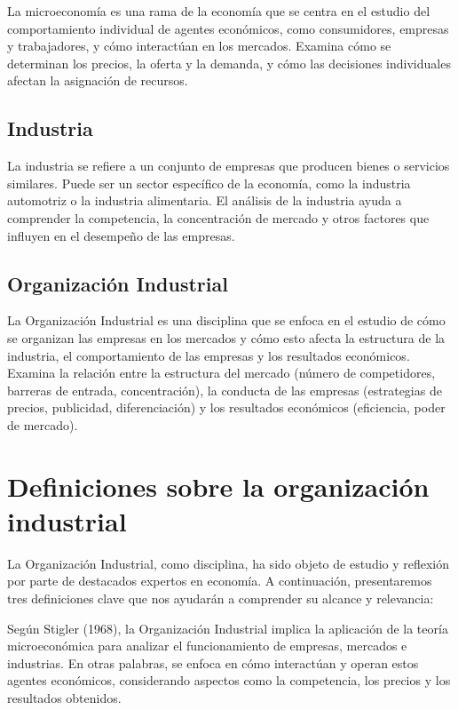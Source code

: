 \documentclass[
  a4paper,
]{article}
\begin{document}
La microeconomía es una rama de la economía que se centra en el estudio
del comportamiento individual de agentes económicos, como consumidores,
empresas y trabajadores, y cómo interactúan en los mercados. Examina
cómo se determinan los precios, la oferta y la demanda, y cómo las
decisiones individuales afectan la asignación de recursos.

\hypertarget{industria}{%
\subsection{Industria}\label{industria}}

La industria se refiere a un conjunto de empresas que producen bienes o
servicios similares. Puede ser un sector específico de la economía, como
la industria automotriz o la industria alimentaria. El análisis de la
industria ayuda a comprender la competencia, la concentración de mercado
y otros factores que influyen en el desempeño de las empresas.

\hypertarget{organizaciuxf3n-industrial}{%
\subsection{Organización Industrial}\label{organizaciuxf3n-industrial}}

La Organización Industrial es una disciplina que se enfoca en el estudio
de cómo se organizan las empresas en los mercados y cómo esto afecta la
estructura de la industria, el comportamiento de las empresas y los
resultados económicos. Examina la relación entre la estructura del
mercado (número de competidores, barreras de entrada, concentración), la
conducta de las empresas (estrategias de precios, publicidad,
diferenciación) y los resultados económicos (eficiencia, poder de
mercado).

\hypertarget{definiciones-sobre-la-organizaciuxf3n-industrial}{%
\section{Definiciones sobre la organización
industrial}\label{definiciones-sobre-la-organizaciuxf3n-industrial}}

La Organización Industrial, como disciplina, ha sido objeto de estudio y
reflexión por parte de destacados expertos en economía. A continuación,
presentaremos tres definiciones clave que nos ayudarán a comprender su
alcance y relevancia:

Según Stigler (1968), la Organización Industrial implica la aplicación
de la teoría microeconómica para analizar el funcionamiento de empresas,
mercados e industrias. En otras palabras, se enfoca en cómo interactúan
y operan estos agentes económicos, considerando aspectos como la
competencia, los precios y los resultados obtenidos.
\end{document}
